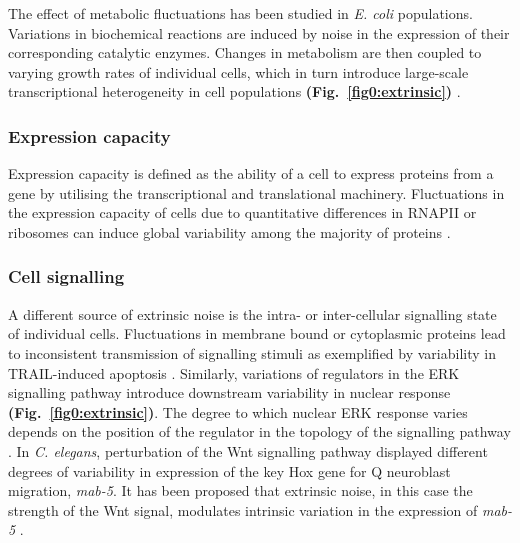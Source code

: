 The effect of metabolic fluctuations has been studied in \textit{E. coli} populations. 
Variations in biochemical reactions are induced by noise in the expression of their corresponding catalytic enzymes. 
Changes in metabolism are then coupled to varying growth rates of individual cells, which in turn introduce large-scale transcriptional heterogeneity in cell populations \textbf{(Fig.~\ref{fig0:extrinsic})} \citep{Kiviet2014}.  

\subsubsection{Expression capacity}

Expression capacity is defined as the ability of a cell to express proteins from a gene by utilising the transcriptional and translational machinery. 
Fluctuations in the expression capacity of cells due to quantitative differences in RNAPII or ribosomes can induce global variability among the majority of proteins \citep{Colman-Lerner2005}.

\newpage

\subsubsection{Cell signalling}

A different source of extrinsic noise is the intra- or inter-cellular signalling state of individual cells. 
Fluctuations in membrane bound or cytoplasmic proteins lead to inconsistent transmission of signalling stimuli as exemplified by variability in \gls{TRAIL}-induced apoptosis \citep{Spencer2009}. 
Similarly, variations of regulators in the \gls{ERK} signalling pathway introduce downstream variability in nuclear response \textbf{(Fig.~\ref{fig0:extrinsic})}. 
The degree to which nuclear ERK response varies depends on the position of the regulator in the topology of the signalling pathway \citep{Iwamoto2016}. 
In \textit{C. elegans}, perturbation of the Wnt signalling pathway displayed different degrees of variability in expression of the key Hox gene for Q neuroblast migration, \textit{mab-5}. 
It has been proposed that extrinsic noise, in this case the strength of the Wnt signal, modulates intrinsic variation in the expression of \textit{mab-5} \citep{Ji2013}. 


